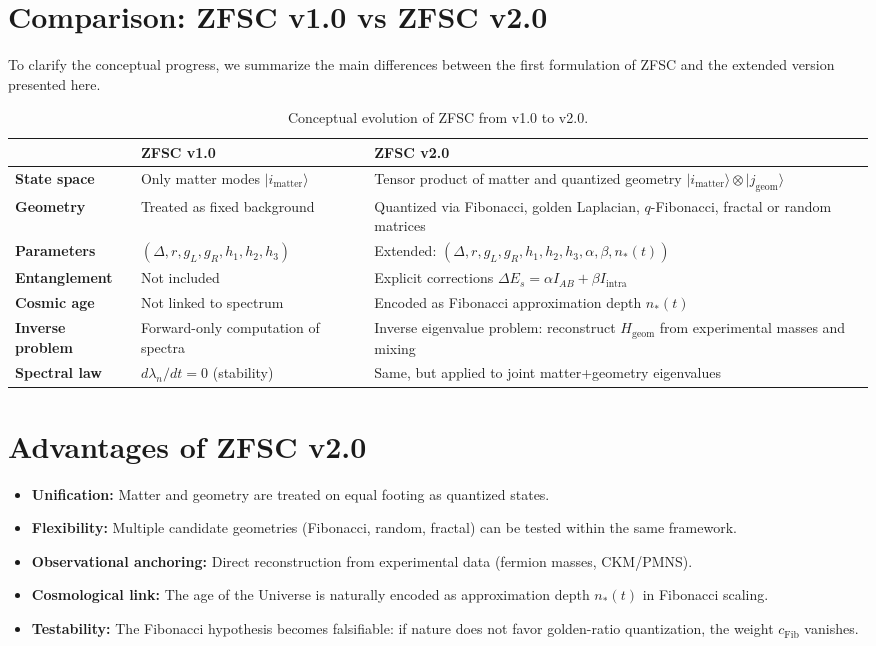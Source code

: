 \section{Comparison: ZFSC v1.0 vs ZFSC v2.0}

To clarify the conceptual progress, we summarize the main differences between the first formulation of ZFSC and the extended version presented here.

\begin{table}[h!]
\centering
\begin{tabular}{@{}p{4cm}p{5.5cm}p{5.5cm}@{}}
\toprule
 & \textbf{ZFSC v1.0} & \textbf{ZFSC v2.0} \\
\midrule
\textbf{State space} & Only matter modes $|i_{\mathrm{matter}}\rangle$ & Tensor product of matter and quantized geometry $|i_{\mathrm{matter}}\rangle \otimes |j_{\mathrm{geom}}\rangle$ \\
\textbf{Geometry} & Treated as fixed background & Quantized via Fibonacci, golden Laplacian, $q$-Fibonacci, fractal or random matrices \\
\textbf{Parameters} & $(\Delta, r, g_L, g_R, h_1,h_2,h_3)$ & Extended: $(\Delta, r, g_L, g_R, h_1,h_2,h_3, \alpha, \beta, n_*(t))$ \\
\textbf{Entanglement} & Not included & Explicit corrections $\Delta E_s = \alpha I_{AB} + \beta I_{\mathrm{intra}}$ \\
\textbf{Cosmic age} & Not linked to spectrum & Encoded as Fibonacci approximation depth $n_*(t)$ \\
\textbf{Inverse problem} & Forward-only computation of spectra & Inverse eigenvalue problem: reconstruct $H_{\mathrm{geom}}$ from experimental masses and mixing \\
\textbf{Spectral law} & $d\lambda_n/dt = 0$ (stability) & Same, but applied to joint matter+geometry eigenvalues \\
\bottomrule
\end{tabular}
\caption{Conceptual evolution of ZFSC from v1.0 to v2.0.}
\end{table}

\section{Advantages of ZFSC v2.0}
\begin{itemize}
    \item \textbf{Unification:} Matter and geometry are treated on equal footing as quantized states.  
    \item \textbf{Flexibility:} Multiple candidate geometries (Fibonacci, random, fractal) can be tested within the same framework.  
    \item \textbf{Observational anchoring:} Direct reconstruction from experimental data (fermion masses, CKM/PMNS).  
    \item \textbf{Cosmological link:} The age of the Universe is naturally encoded as approximation depth $n_*(t)$ in Fibonacci scaling.  
    \item \textbf{Testability:} The Fibonacci hypothesis becomes falsifiable: if nature does not favor golden-ratio quantization, the weight $c_{\mathrm{Fib}}$ vanishes.  
\end{itemize}

